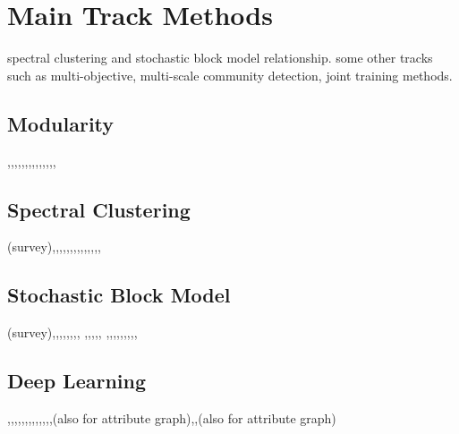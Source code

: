 \section{Main Track Methods}
spectral clustering and stochastic block model relationship. some other tracks such as multi-objective, multi-scale community detection, joint training methods. 
\subsection{Modularity}
\cite{newman2004fast},\cite{newman2006modularity},\cite{nicosia2009extending},\cite{yang2016modularity},\cite{newman2016equivalence},\cite{sun2013maximizing},\cite{cafieri2011locally},\cite{jiang2012modularity},\cite{xiang2016local},\cite{zhang2013normalized},\cite{bagrow2012communities},\cite{bu2013fast},\cite{chen2014anti},\cite{chen2014community},


\subsection{Spectral Clustering}
\cite{nascimento2011spectral}(survey),\cite{newman2013spectral},\cite{bruna2013spectral},\cite{saade2014spectral},\cite{krzakala2013spectral},\cite{benson2015tensor},\cite{nadakuditi2012graph},\cite{rohe2011spectral},\cite{lei2015consistency},\cite{chaudhuri2012spectral},\cite{joseph2016impact},\cite{jin2015fast},\cite{mahoney2012local},\cite{zhang2015multiway},\cite{liu2013large}


\subsection{Stochastic Block Model}
\cite{abbe2017community} (survey),\cite{karrer2011stochastic},\cite{he2015stochastic},\cite{zhang2016minimax},\cite{wang2017likelihood},\cite{lei2016goodness},\cite{gao2018community},\cite{mossel2016density},
\cite{zhao2012consistency},\cite{celisse2012consistency},\cite{yan2014model},\cite{abbe2015community}\cite{heimlicher2012community},\cite{yun2014accurate},
\cite{yun2016optimal},\cite{qin2013regularized},\cite{peixoto2014efficient},\cite{peixoto2017nonparametric},\cite{sarkar2015role},\cite{lyzinski2014perfect},\cite{xu2014edge},\cite{mossel2014belief},\cite{peixoto2012entropy},


\subsection{Deep Learning}
\cite{chiang2019cluster},\cite{wang2017mgae},\cite{tian2014learning},\cite{bruna2017community},\cite{wang2017community},\cite{cavallari2017learning},\cite{shao2015deep},\cite{zheng2016node},\cite{rozemberczki2019gemsec},\cite{sun2017non},\cite{bhatia2018dfuzzy},\cite{yang2016modularity},\cite{huang2014deep},\cite{jin2019graph}(also for attribute graph),\cite{zhang2019attributed},(also for attribute graph)

